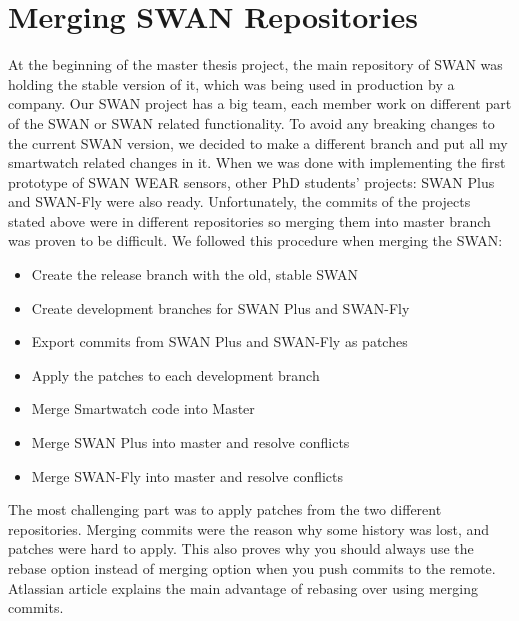 
\chapter{Merging SWAN Repositories} %

\label{AppendixB} %

At the beginning of the master thesis project, the main repository of SWAN was holding the stable version of it, which was being used in production 
by a  company. Our SWAN project has a big team, each member work on different part of the SWAN or SWAN related functionality.
To avoid any breaking changes to the current SWAN version, we decided to make a different branch and put all my smartwatch related changes in it.
When we was done with implementing the first prototype of SWAN WEAR sensors, other PhD students' projects: SWAN Plus\cite{swan_plus} and SWAN-Fly\cite{swan_fly} were also ready.
Unfortunately, the commits of the projects stated above were in different repositories so merging them into master branch was proven to be difficult.
We followed this procedure when merging the SWAN:
\begin{itemize}
 \item Create the release branch with the old, stable SWAN
 \item Create development branches for SWAN Plus and SWAN-Fly
 \item Export commits from SWAN Plus and SWAN-Fly as patches
 \item Apply the patches to each development branch
 \item Merge Smartwatch code into Master
 \item Merge SWAN Plus into master and resolve conflicts
 \item Merge SWAN-Fly into master and resolve conflicts
\end{itemize}

The most challenging part was to apply patches from the two different repositories. Merging commits were the reason why some history was 
lost, and patches were hard to apply. This also proves why you should always use the rebase option instead of merging option when you push commits
to the remote. Atlassian article\cite{atlassian_merge_rebase} explains the main advantage of rebasing over using merging commits.
